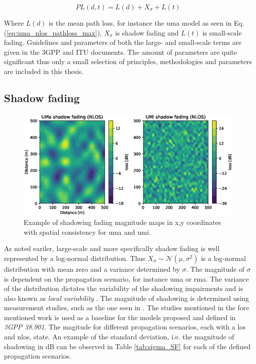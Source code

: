 \begin{equation}\label{eq:pathloss_model}
  PL(d,t) = L(d) + X_\sigma + L(t)
\end{equation}

Where $L(d)$ is the mean path loss, for instance the \gls{uma} model as seen in Eq. (\ref{eq:uma_nlos_pathloss_max}), $X_\sigma$ is shadow fading and $L(t)$ is small-scale fading. Guidelines and parameters of both the large- and small-scale terms are given in the 3GPP and ITU documents. The amount of parameters are quite significant thus only a small selection of principles, methodologies and parameters are included in this thesis. 

\subsection{Shadow fading}

\begin{figure}
    \centering
    \includegraphics{chapters/part_pathloss/figures/UMaUMiShadowFadingMapNLOS.eps}
    \caption{Example of shadowing fading magnitude maps in x,y coordinates with spatial consistency for \gls{uma} and \gls{umi}.}
    \label{fig:my_label}
\end{figure}
As noted eariler, large-scale and more specifically shadow fading is well represented by a log-normal distribution. Thus $X_\sigma \sim \mathcal{N}(\mu, \sigma^2)$ is a log-normal distribution with mean zero and a variance determined by $\sigma$. The magnitude of $\sigma$ is dependent on the propagation scenario, for instance \gls{uma} or \gls{rma}. The variance of the distribution dictates the variability of the shadowing impairments and is also known as \emph{local variability} \cite{Perez-Fontan2008}. The magnitude of shadowing is determined using measurement studies, such as the one seen in \cite{Sun2016}. The studies mentioned in the fore mentioned work is used as a baseline for the models proposed and defined in \textit{3GPP 38.901}. The magitude for different propagation scenarios, each with a \gls{los} and \gls{nlos}, state. An example of the standard deviation, i.e. the magnitude of shadowing in dB can be observed in Table \ref{tab:sigma_SF} for each of the defined propagation scenarios.

